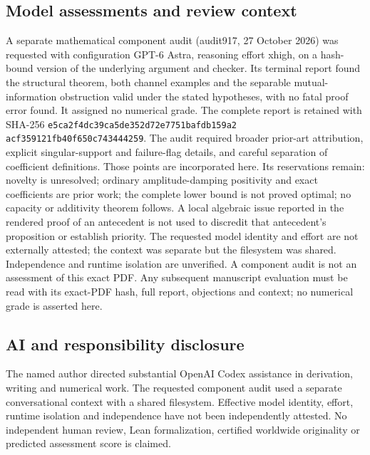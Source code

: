 \documentclass[11pt,a4paper]{article}
\theoremstyle{remark}\newtheorem{remark}[theorem]{Remark}
\begin{document}
\subsection*{Model assessments and review context}
A separate mathematical component audit (audit917, 27 October 2026) was
requested with configuration GPT-6 Astra, reasoning effort xhigh, on a
hash-bound version of the underlying argument and checker. Its terminal
report found the structural theorem, both channel examples and the
separable mutual-information obstruction valid under the stated
hypotheses, with no fatal proof error found. It assigned no numerical grade.
The complete report is retained with SHA-256
\texttt{e5ca2f4dc39ca5de352d72e7751bafdb159a2}\allowbreak
\texttt{acf359121fb40f650c743444259}.
The audit required broader prior-art attribution, explicit singular-support
and failure-flag details, and careful separation of coefficient definitions.
Those points are incorporated here. Its reservations remain: novelty is
unresolved; ordinary amplitude-damping positivity and exact coefficients
are prior work; the complete lower bound is not proved optimal; no
capacity or additivity theorem follows. A local algebraic issue reported
in the rendered proof of an antecedent is not used to discredit that
antecedent's proposition or establish priority.
The requested model identity and effort are not externally attested;
the context was separate but the filesystem was shared. Independence and
runtime isolation are unverified.
A component audit is not an assessment of this exact PDF.
Any subsequent manuscript evaluation must be read with its exact-PDF hash,
full report, objections and context; no numerical grade is asserted here.

\subsection*{AI and responsibility disclosure}
The named author directed substantial OpenAI Codex assistance in derivation,
writing and numerical work. The requested component audit used a separate
conversational context with a shared filesystem. Effective model identity,
effort, runtime isolation and independence have not been independently
attested. No independent human review, Lean formalization, certified
worldwide originality or predicted assessment score is claimed.
\end{document}
